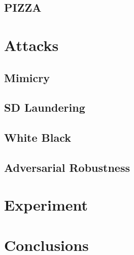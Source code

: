 \documentclass[conference]{IEEEtran} %
\begin{document}
    \subsection{PIZZA}
\section{Attacks}
    \subsection{Mimicry}
    \subsection{SD Laundering}
    \subsection{White Black}
    \subsection{Adversarial Robustness}
\section{Experiment}
\section{Conclusions}

\end{document}
